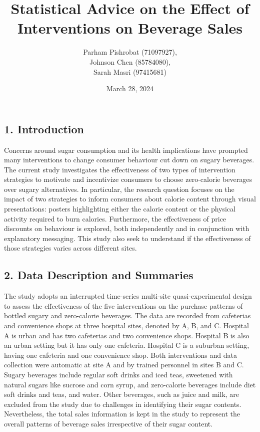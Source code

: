 \documentclass[
]{article}
\title{Statistical Advice on the Effect of Interventions on Beverage
Sales}
\author{Parham Pishrobat (71097927),\\
Johnson Chen (85784080),\\
Sarah Masri (97415681)}
\date{March 28, 2024}
\begin{document}
\maketitle

\pagebreak

\hypertarget{introduction}{%
\subsection{1. Introduction}\label{introduction}}

Concerns around sugar consumption and its health implications have
prompted many interventions to change consumer behaviour cut down on
sugary beverages. The current study investigates the effectiveness of
two types of intervention strategies to motivate and incentivize
consumers to choose zero-calorie beverages over sugary alternatives. In
particular, the research question focuses on the impact of two
strategies to inform consumers about calorie content through visual
presentations: posters highlighting either the calorie content or the
physical activity required to burn calories. Furthermore, the
effectiveness of price discounts on behaviour is explored, both
independently and in conjunction with explanatory messaging. This study
also seek to understand if the effectiveness of those strategies varies
across different sites.

\hypertarget{data-description-and-summaries}{%
\subsection{2. Data Description and
Summaries}\label{data-description-and-summaries}}

The study adopts an interrupted time-series multi-site
quasi-experimental design to assess the effectiveness of the five
interventions on the purchase patterns of bottled sugary and
zero-calorie beverages. The data are recorded from cafeterias and
convenience shops at three hospital sites, denoted by A, B, and C.
Hospital A is urban and has two cafeterias and two convenience shops.
Hospital B is also an urban setting but it has only one cafeteria.
Hospital C is a suburban setting, having one cafeteria and one
convenience shop. Both interventions and data collection were automatic
at site A and by trained personnel in sites B and C. Sugary beverages
include regular soft drinks and iced teas, sweetened with natural sugars
like sucrose and corn syrup, and zero-calorie beverages include diet
soft drinks and teas, and water. Other beverages, such as juice and
milk, are excluded from the study due to challenges in identifying their
sugar contents. Nevertheless, the total sales information is kept in the
study to represent the overall patterns of beverage sales irrespective
of their sugar content.
\end{document}
